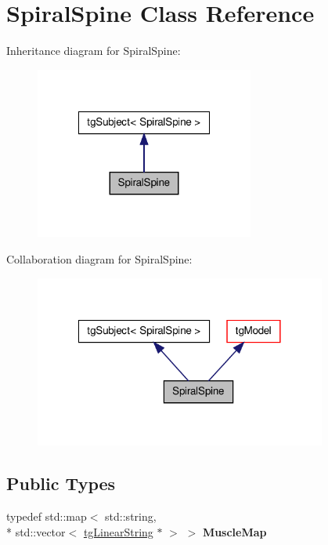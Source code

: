 \hypertarget{class_spiral_spine}{\section{Spiral\-Spine Class Reference}
\label{class_spiral_spine}
}


Inheritance diagram for Spiral\-Spine\-:\nopagebreak
\begin{figure}[H]
\begin{center}
\leavevmode
\includegraphics[width=204pt]{class_spiral_spine__inherit__graph}
\end{center}
\end{figure}


Collaboration diagram for Spiral\-Spine\-:\nopagebreak
\begin{figure}[H]
\begin{center}
\leavevmode
\includegraphics[width=272pt]{class_spiral_spine__coll__graph}
\end{center}
\end{figure}
\subsection*{Public Types}
\begin{DoxyCompactItemize}
\item 
\hypertarget{class_spiral_spine_aae6f6a5e783397af63f7a1dcd8b2beed}{typedef std\-::map$<$ std\-::string, \\*
std\-::vector$<$ \hyperlink{classtg_linear_string}{tg\-Linear\-String} $\ast$ $>$ $>$ {\bfseries Muscle\-Map}}\label{class_spiral_spine_aae6f6a5e783397af63f7a1dcd8b2beed}

\end{DoxyCompactItemize}
